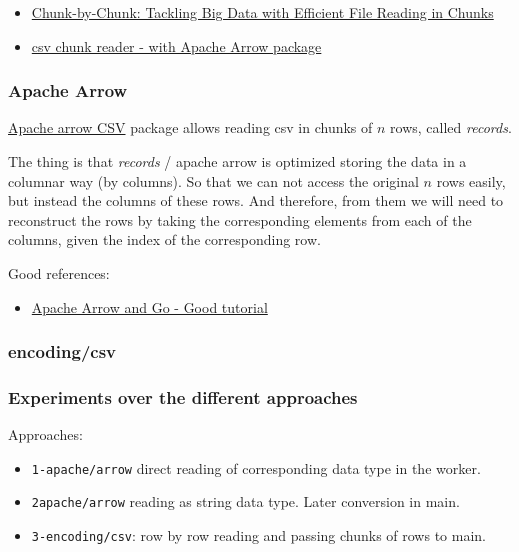 \begin{itemize}
  \item \href{https://medium.com/@anuragv.1020/chunk-by-chunk-tackling-big-data-with-efficient-file-reading-in-chunks-c6f7cf153ccd}{Chunk-by-Chunk: Tackling Big Data with Efficient File Reading in Chunks}
  \item \href{https://pkg.go.dev/github.com/apache/arrow/go/arrow/csv#NewReader}{csv chunk reader - with Apache Arrow package}
\end{itemize}

\subsubsection{Apache Arrow}

\href{https://pkg.go.dev/github.com/apache/arrow/go/v12@v12.0.1/arrow/csv}{Apache arrow CSV}
package allows reading csv in chunks of $n$ rows, called \emph{records}.

The thing is that \emph{records} / apache arrow is optimized storing the data in a columnar way (by columns). So that we can not access the original $n$ rows easily, but instead the columns of these rows. And therefore, from them we will need to reconstruct the rows by taking the corresponding elements from each of the columns, given the index of the corresponding row.

Good references:
\begin{itemize}
  \item \href{https://www.apachecon.com/acna2022/slides/01_Topol_Arrow_and_Go.pdf}{Apache Arrow and Go - Good tutorial}
\end{itemize}


\subsubsection{encoding/csv}

\subsubsection{Experiments over the different approaches}

Approaches:
\begin{itemize}
  \item \texttt{1-apache/arrow} direct reading of corresponding data type in the worker.
  \item \texttt{2apache/arrow} reading as string data type. Later conversion in main.
  \item \texttt{3-encoding/csv}: row by row reading and passing chunks of rows to main.
\end{itemize}

